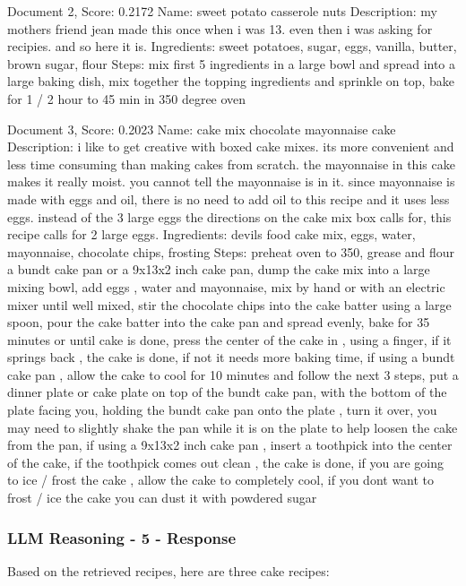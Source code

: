 \documentclass[a4paper,11pt]{article}
\begin{document}
Document 2, Score: 0.2172
Name: sweet potato casserole nuts
Description: my mothers friend jean made this once when i was 13. even then i was asking for recipies. and so here it is.
Ingredients: sweet potatoes, sugar, eggs, vanilla, butter, brown sugar, flour
Steps: mix first 5 ingredients in a large bowl and spread into a large baking dish, mix together the topping ingredients and sprinkle on top, bake for 1 / 2 hour to 45 min in 350 degree oven

Document 3, Score: 0.2023
Name: cake mix chocolate mayonnaise cake
Description: i like to get creative with boxed cake mixes. its more convenient and less time consuming than making cakes from scratch. the mayonnaise in this cake makes it really moist. you cannot tell the mayonnaise is in it. since mayonnaise is made with eggs and oil, there is no need to add oil to this recipe and it uses less eggs. instead of the 3 large eggs the directions on the cake mix box calls for, this recipe calls for 2 large eggs.
Ingredients: devils food cake mix, eggs, water, mayonnaise, chocolate chips, frosting
Steps: preheat oven to 350, grease and flour a bundt cake pan or a 9x13x2 inch cake pan, dump the cake mix into a large mixing bowl, add eggs , water and mayonnaise, mix by hand or with an electric mixer until well mixed, stir the chocolate chips into the cake batter using a large spoon, pour the cake batter into the cake pan and spread evenly, bake for 35 minutes or until cake is done, press the center of the cake in , using a finger, if it springs back , the cake is done, if not it needs more baking time, if using a bundt cake pan , allow the cake to cool for 10 minutes and follow the next 3 steps, put a dinner plate or cake plate on top of the bundt cake pan, with the bottom of the plate facing you, holding the bundt cake pan onto the plate , turn it over, you may need to slightly shake the pan while it is on the plate to help loosen the cake from the pan, if using a 9x13x2 inch cake pan , insert a toothpick into the center of the cake, if the toothpick comes out clean , the cake is done, if you are going to ice / frost the cake , allow the cake to completely cool, if you dont want to frost / ice the cake you can dust it with powdered sugar




\subsubsection{LLM Reasoning - 5 - Response}
Based on the retrieved recipes, here are three cake recipes:
\end{document}
